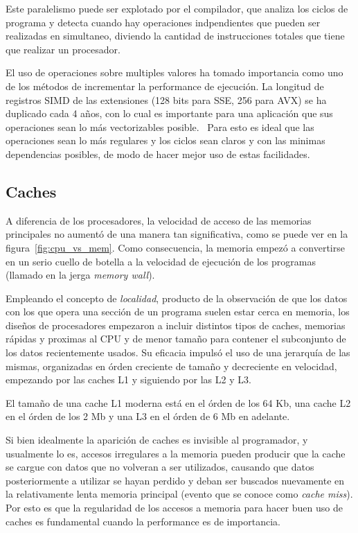 Este paralelismo puede ser explotado por el compilador, que analiza los ciclos de programa y detecta cuando hay operaciones
indpendientes que pueden ser realizadas en simultaneo, diviendo la cantidad de instrucciones totales que tiene que realizar
un procesador.

El uso de operaciones sobre multiples valores ha tomado importancia como uno de los m\'etodos de incrementar
la performance de ejecuci\'on. La longitud de registros SIMD de las extensiones (128 bits para SSE, 256 para AVX)
se ha duplicado cada 4 a\~nos, con lo cual es importante para una aplicaci\'on que sus operaciones sean lo m\'as
vectorizables posible.~\cite{HennessyPatterson} Para esto es ideal que las operaciones sean lo m\'as regulares y
los ciclos sean claros y con las minimas dependencias posibles, de modo de hacer mejor uso de estas facilidades.

\subsection{Caches}

A diferencia de los procesadores, la velocidad de acceso de las memorias principales no aument\'o de una manera
tan significativa, como se puede ver en la figura~\ref{fig:cpu_vs_mem}. Como consecuencia, la memoria
empez\'o a convertirse en un serio cuello de botella a la velocidad de ejecuci\'on de los programas (llamado
en la jerga \textit{memory wall}).

Empleando el concepto de \textit{localidad}, producto de la observaci\'on de que los datos con los que opera una
secci\'on de un programa suelen estar cerca en memoria, los dise\~nos de procesadores empezaron a incluir distintos
tipos de caches, memorias r\'apidas y proximas al CPU y de menor tama\~no para contener el subconjunto de los datos
recientemente usados. Su eficacia impuls\'o el uso de una jerarqu\'ia de las mismas, organizadas en \'orden creciente
de tama\~no y decreciente en velocidad, empezando por las caches L1 y siguiendo por las L2 y L3.

El tama\~no de una cache L1 moderna est\'a en el \'orden de los 64 Kb, una cache L2 en el \'orden de los 2 Mb y
una L3 en el \'orden de 6 Mb en adelante.

Si bien idealmente la aparici\'on de caches es invisible al programador, y usualmente lo es, accesos irregulares a la
memoria pueden producir que la cache se cargue con datos que no volveran a ser utilizados, causando que datos posteriormente
a utilizar se hayan perdido y deban ser buscados nuevamente en la relativamente lenta memoria principal (evento que se conoce como
\textit{cache miss}). Por esto es que la regularidad de los accesos a memoria para hacer buen uso de caches es
fundamental cuando la performance es de importancia.

